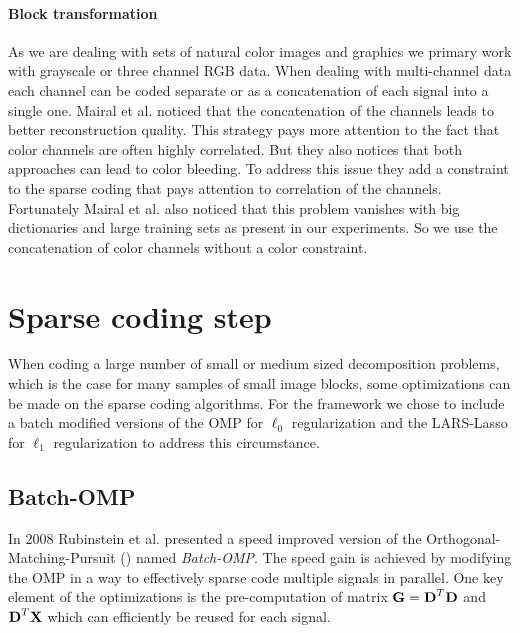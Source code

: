\paragraph{Block transformation} As we are dealing with sets of natural
color images and graphics we primary work with grayscale or three
channel RGB data. 
When dealing with multi-channel data each channel can be coded
separate or as a concatenation of each signal into a single one. Mairal et
al.\cite{mairal08sparse} noticed that the concatenation of the channels leads
to better reconstruction quality. This strategy pays more attention to the fact
that color channels are often highly correlated. But they also notices that both
approaches can lead to color bleeding.  
To address this issue they add a constraint to the sparse coding that pays
attention to correlation of the channels. 
Fortunately Mairal et al. also noticed that this problem vanishes with big
dictionaries and large training sets as present in our experiments. So we use
the concatenation of color channels without a color constraint. 

\begin{figure}[h]
\centering
\label{fig:channel_concat}
\end{figure}


\section{Sparse coding step}
When coding a large number of small or medium sized decomposition problems,
which is the case for many samples of small image blocks, some optimizations can
be made on the sparse coding algorithms. 
For the framework we chose to include a batch modified versions of the OMP for
$\ell_0$ regularization and the LARS-Lasso for $\ell_1$ regularization to
address this circumstance. 

\subsection{Batch-OMP}
In 2008 Rubinstein et al.\cite{Rubinstein2008} presented a speed improved
version of the Orthogonal-Matching-Pursuit () named
\emph{Batch-OMP}. The speed gain is achieved by modifying the OMP in a way to
effectively sparse code multiple signals in parallel. One key element of the
optimizations is the pre-computation of matrix $\boldsymbol{\mathrm{G}}=\boldsymbol{\mathrm{D}}^T\boldsymbol{\mathrm{D}}$ and
$\boldsymbol{\mathrm{D}}^T\boldsymbol{\mathrm{X}}$ which can efficiently be reused for each signal. 

